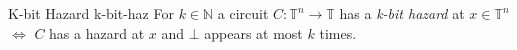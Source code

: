 
\begin{definitionbox}{K-bit Hazard \cite{ikenmeyer_ComplexityHazardfreeCircuits_2019}}{k-bit-haz}
	For $k \in \mathbb{N}$ a circuit $C: \mathbb{T}^n \to \mathbb{T}$ has a \textit{k-bit hazard} at $x \in \mathbb{T}^n$
	$\iff$ $C$ has a hazard at $x$ and $\bot$ appears at most $k$ times.
\end{definitionbox}
%
%
%
